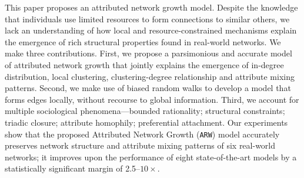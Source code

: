 
This paper proposes an attributed network growth model. Despite the knowledge that individuals use limited resources to form connections to similar others, we lack an understanding of how local and resource-constrained mechanisms explain the emergence of rich structural properties found in real-world networks.
We make three contributions. First, we propose a parsimonious and accurate model of attributed network growth that jointly explains the emergence of in-degree distribution, local clustering, clustering-degree relationship and attribute mixing patterns.
Second, we make use of biased random walks to develop a model that forms edges locally, without recourse to global information.
Third, we account for multiple sociological phenomena---bounded rationality; structural constraints; triadic closure; attribute homophily; preferential attachment.
Our experiments show that the proposed Attributed Network Growth (\texttt{ARW}) model accurately preserves network structure and attribute mixing patterns of six real-world networks; it improves upon the performance of eight state-of-the-art models by a
statistically significant margin of 2.5--$10\times$.



